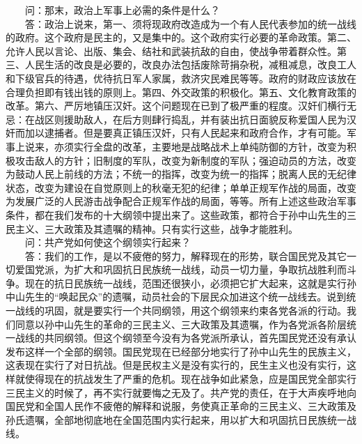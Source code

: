 \documentclass[cn,11pt,chinese]{elegantbook}
\begin{document}
　　问：那末，政治上军事上必需的条件是什么？\\
　　答：政治上说来，第一、须将现政府改造成为一个有人民代表参加的统一战线的政府。这个政府是民主的，又是集中的。这个政府实行必要的革命政策。第二、允许人民以言论、出版、集会、结社和武装抗敌的自由，使战争带着群众性。第三、人民生活的改良是必要的，改良办法包括废除苛捐杂税，减租减息，改良工人和下级官兵的待遇，优待抗日军人家属，救济灾民难民等等。政府的财政应该放在合理负担即有钱出钱的原则上。第四、外交政策的积极化。第五、文化教育政策的改革。第六、严厉地镇压汉奸。这个问题现在已到了极严重的程度。汉奸们横行无忌：在战区则援助敌人，在后方则肆行捣乱，并有装出抗日面貌反称爱国人民为汉奸而加以逮捕者。但是要真正镇压汉奸，只有人民起来和政府合作，才有可能。军事上说来，亦须实行全盘的改革，主要地是战略战术上单纯防御的方针，改变为积极攻击敌人的方针；旧制度的军队，改变为新制度的军队；强迫动员的方法，改变为鼓动人民上前线的方法；不统一的指挥，改变为统一的指挥；脱离人民的无纪律状态，改变为建设在自觉原则上的秋毫无犯的纪律；单单正规军作战的局面，改变为发展广泛的人民游击战争配合正规军作战的局面，等等。所有上述这些政治军事条件，都在我们发布的十大纲领中提出来了。这些政策，都符合于孙中山先生的三民主义、三大政策及其遗嘱的精神。只有实行这些，战争才能胜利。\\
　　问：共产党如何使这个纲领实行起来？\\
　　答：我们的工作，是以不疲倦的努力，解释现在的形势，联合国民党及其它一切爱国党派，为扩大和巩固抗日民族统一战线，动员一切力量，争取抗战胜利而斗争。现在的抗日民族统一战线，范围还很狭小，必须把它扩大起来，这就是实行孙中山先生的“唤起民众”的遗嘱，动员社会的下层民众加进这个统一战线去。说到统一战线的巩固，就是要实行一个共同纲领，用这个纲领来约束各党各派的行动。我们同意以孙中山先生的革命的三民主义、三大政策及其遗嘱，作为各党派各阶层统一战线的共同纲领。但这个纲领至今没有为各党派所承认，首先国民党还没有承认发布这样一个全部的纲领。国民党现在已经部分地实行了孙中山先生的民族主义，这表现在实行了对日抗战。但是民权主义是没有实行的，民生主义也没有实行，这样就使得现在的抗战发生了严重的危机。现在战争如此紧急，应是国民党全部实行三民主义的时候了，再不实行就要悔之无及了。共产党的责任，在于大声疾呼地向国民党和全国人民作不疲倦的解释和说服，务使真正革命的三民主义、三大政策及孙氏遗嘱，全部地彻底地在全国范围内实行起来，用以扩大和巩固抗日民族统一战线。\\
\end{document}
